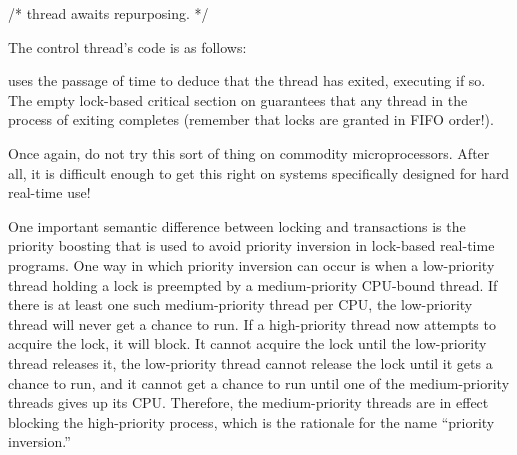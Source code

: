 {{\begin{VerbatimN}
	/* thread awaits repurposing. */
\end{VerbatimN}

	The control thread's code is as follows:

\begin{fcvlabel}
\end{fcvlabel}

	\begin{fcvref}
	 uses the passage of time to deduce that the thread
	has exited, executing  if so.
	The empty lock-based critical section on 
	guarantees that any thread in the process of exiting
	completes (remember that locks are granted in FIFO order!).
	\end{fcvref}

	Once again, do not try this sort of thing on commodity
	microprocessors.
	After all, it is difficult enough to get this right on systems
	specifically designed for hard real-time use!
}\QuickQuizEndE
}

One important semantic difference between locking and transactions
is the priority boosting that is used to avoid priority inversion
in lock-based real-time programs.
One way in which priority inversion can occur is when a
low-priority thread holding a lock
is preempted by a medium-priority CPU-bound thread.
If there is at least one such medium-priority thread per CPU, the
low-priority thread will never get a chance to run.
If a high-priority thread now attempts to acquire the lock,
it will block.
It cannot acquire the lock until the low-priority thread releases it,
the low-priority thread cannot release the lock until it gets a chance
to run, and it cannot get a chance to run until one of the medium-priority
threads gives up its CPU\@.
Therefore, the medium-priority threads are in effect blocking the
high-priority process, which is the rationale for the name ``priority
inversion.''

